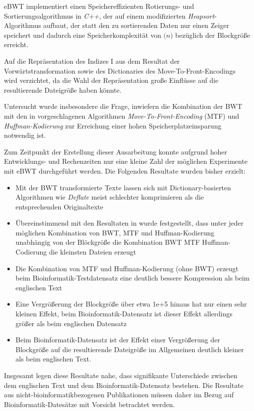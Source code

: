 \documentclass[ngerman,pdftex,paper=A4,DIV=calc,titlepage,12pt]{scrartcl}
\newtheorem[L]{boxedDefinition}{Definition}
\begin{document}
eBWT implementiert einen Speichereffizienten Rotierungs- und Sortierungsalgorithmus in \textit{C++}, der auf einem modifizierten \textit{Heapsort}-Algorithmus aufbaut, der statt den zu sortierenden Daten nur einen Zeiger  speichert und dadurch eine Speicherkomplexität von $\mathcal(n)$ bezüglich der Blockgröße erreicht.

Auf die Repräsentation des Indizes I aus dem Resultat der Vorwärtstransformation sowie des Dictionaries des Move-To-Front-Encodings wird verzichtet, da die Wahl der Repräsentation große Einflüsse auf die resultierende Dateigröße haben könnte.

Untersucht wurde insbesondere die Frage, inwiefern die Kombination der BWT mit den in \cite{burrows1994block} vorgeschlagenen Algorithmen \textit{Move-To-Front-Encoding} (MTF) und \textit{Huffman-Kodierung} zur Erreichung einer hohen Speicherplatzeinsparung notwendig ist.

Zum Zeitpunkt der Erstellung dieser Ausarbeitung konnte aufgrund hoher Entwicklungs- und Rechenzeiten nur eine kleine Zahl der möglichen Experimente mit eBWT durchgeführt werden. Die Folgenden Resultate wurden bisher erzielt:
\begin{itemize}
 \item Mit der BWT transformierte Texte lassen sich mit Dictionary-basierten Algorithmen wie \textit{Deflate} meist schlechter komprimieren als die entsprechenden Originaltexte
 \item Übereinstimmend mit den Resultaten in \cite{burrows1994block} wurde festgestellt, dass unter jeder möglichen Kombination von BWT, MTF und Huffman-Kodierung unabhängig von der Blöckgröße die Kombination BWT \textrightarrow MTF \textrightarrow Huffman-Codierung die kleinsten Dateien erzeugt
 \item Die Kombination von MTF und Huffman-Kodierung (ohne BWT) erzeugt beim Bioinformatik-Testdatensatz eine deutlich bessere Kompression als beim englischen Text
 \item Eine Vergrößerung der Blockgröße über etwa 1e+5 hinaus hat nur einen sehr kleinen Effekt, beim Bioinformatik-Datensatz ist dieser Effekt allerdings größer als beim englischen Datensatz
 \item Beim Bioinformatik-Datensatz ist der Effekt einer Vergrößerung der Blockgröße auf die resultierende Dateigröße im Allgemeinen deutlich kleiner als beim englischen Text.
\end{itemize}
Insgesamt legen diese Resultate nahe, dass signifikante Unterschiede zwischen dem englischen Text und dem Bioinformatik-Datensatz bestehen. Die Resultate aus nicht-bioinformatikbezogenen Publikationen müssen daher im Bezug auf Bioinformatik-Datesätze mit Vorsicht betrachtet werden.
\end{document}
